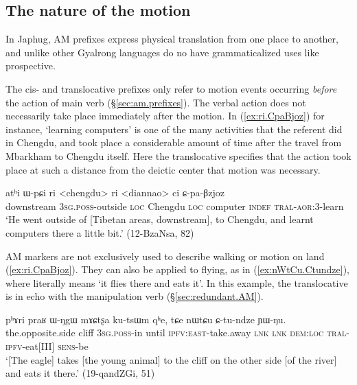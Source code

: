 \subsection{The nature of the motion} \label{sec:nature.of.motion.AM}
In Japhug, AM prefixes express physical translation from one place to another, and unlike other Gyalrong languages do no have grammaticalized uses like prospective. 

The cis- and translocative prefixes only refer to motion events occurring \textit{before} the action of main verb (§\ref{sec:am.prefixes}). The verbal action does not necessarily take place immediately after the motion. In (\ref{ex:ri.CpaBjoz}) for instance, `learning computers' is one of the many activities that the referent did in Chengdu, and took place a considerable amount of time after the travel from Mbarkham to Chengdu itself. Here the translocative specifies that the action took place at such a distance from the deictic center that motion was necessary.

\begin{exe}
\ex \label{ex:ri.CpaBjoz} 
\gll atʰi ɯ-pɕi ri <chengdu> ri <diannao> ci ɕ-pa-βzjoz \\
downstream \textsc{3sg}.\textsc{poss}-outside \textsc{loc} Chengdu \textsc{loc} computer \textsc{indef} \textsc{tral}-\textsc{aor}:3\flobv{}-learn \\
\glt `He went outside of [Tibetan areas, downstream], to Chengdu, and learnt computers there a little bit.' (12-BzaNsa, 82)
\end{exe}

AM markers are not exclusively used to describe walking or motion on land (\ref{ex:ri.CpaBjoz}). They can also be applied to flying, as in (\ref{ex:nWtCu.Ctundze}), where  literally means `it flies there and eats it'. In this example, the translocative is in echo with the manipulation verb  (§\ref{sec:redundant.AM}).

\begin{exe}
\ex \label{ex:nWtCu.Ctundze}
\gll pʰɤri praʁ ɯ-ŋgɯ mɤɕtʂa ku-tsɯm qʰe, tɕe nɯtɕu ɕ-tu-ndze ɲɯ-ŋu. \\
the.opposite.side cliff \textsc{3sg}.\textsc{poss}-in until  \textsc{ipfv}:\textsc{east}-take.away \textsc{lnk} \textsc{lnk} \textsc{dem}:\textsc{loc} \textsc{tral}-\textsc{ipfv}-eat[III] \textsc{sens}-be \\
\glt `[The eagle] takes [the young animal] to the cliff on the other side [of the river] and eats it there.' (19-qandZGi, 51)
\end{exe}

